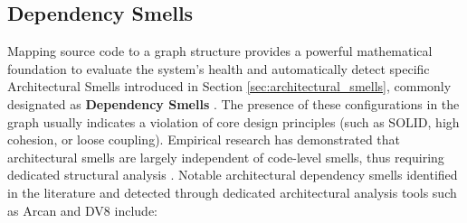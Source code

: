 \subsection{Dependency Smells}
Mapping source code to a graph structure provides a powerful
mathematical foundation to evaluate the system's health and
automatically detect specific Architectural Smells introduced in
Section \ref{sec:architectural_smells}, commonly designated as
\textbf{Dependency Smells} \cite{fontana_arcan_2017}. The presence of these
configurations in the graph usually indicates a violation of core
design principles (such as SOLID, high cohesion, or loose coupling).
Empirical research has demonstrated that architectural smells are largely
independent of code-level smells, thus requiring dedicated structural
analysis \cite{arcelli_fontana_independent_2019}.
Notable architectural dependency smells identified in the
literature \cite{garcia_identifying_2009} and detected through dedicated
architectural analysis tools such as Arcan \cite{fontana_arcan_2017} and
DV8 \cite{cai_dv8_2019} include:

